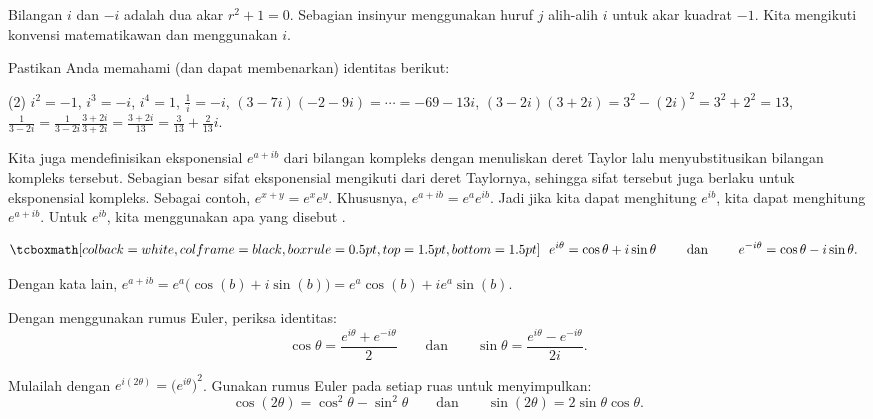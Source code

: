 Bilangan $i$ dan $-i$ adalah dua akar $r^2 + 1 = 0$. Sebagian insinyur menggunakan huruf $j$ alih-alih $i$ untuk akar kuadrat $-1$. Kita mengikuti konvensi matematikawan dan menggunakan $i$.

\begin{exercise}
Pastikan Anda memahami (dan dapat membenarkan) identitas berikut:
\begin{tasks}(2)
\task $i^2 = -1$, $i^3 = -i$, $i^4 = 1$,
\task $\frac{1}{i} = -i$,
\task $(3-7i)(-2-9i) = \cdots = -69-13i$,
\task $(3-2i)(3+2i) = 3^2 - {(2i)}^2 = 3^2 + 2^2 = 13$,
\task $\frac{1}{3-2i} = \frac{1}{3-2i} \frac{3+2i}{3+2i} = \frac{3+2i}{13}
= \frac{3}{13}+\frac{2}{13}i$.
\end{tasks}
\end{exercise}

\pagebreak[2]
Kita juga mendefinisikan eksponensial $e^{a+ib}$ dari bilangan kompleks dengan menuliskan deret Taylor lalu menyubstitusikan bilangan kompleks tersebut. Sebagian besar sifat eksponensial mengikuti dari deret Taylornya, sehingga sifat tersebut juga berlaku untuk eksponensial kompleks. Sebagai contoh, $e^{x+y} = e^x e^y$. Khususnya, $e^{a+ib} = e^a e^{ib}$. Jadi jika kita dapat menghitung $e^{ib}$, kita dapat menghitung $e^{a+ib}$. Untuk $e^{ib}$, kita menggunakan apa yang disebut \emph{}.

\begin{theorem} \label{eulersformula}
\begin{equation*}
\mybxbg{~~
e^{i \theta} = \cos \theta + i \sin \theta
\qquad \text{ dan } \qquad
e^{- i \theta} = \cos \theta - i \sin \theta .
~~}
\end{equation*}
\end{theorem}

Dengan kata lain, $e^{a+ib} = e^a \bigl( \cos(b) + i \sin(b) \bigr) = e^a \cos(b) + i e^a \sin(b)$.

\begin{exercise}
Dengan menggunakan rumus Euler, periksa identitas:
\begin{equation*}
\cos \theta = \frac{e^{i \theta} + e^{-i \theta}}{2}
\qquad \text{dan} \qquad
\sin \theta = \frac{e^{i \theta} - e^{-i \theta}}{2i}.
\end{equation*}
\end{exercise}

\begin{exercise}
Mulailah dengan $e^{i(2\theta)} = {\bigl(e^{i \theta} \bigr)}^2$. Gunakan rumus Euler pada setiap ruas untuk menyimpulkan:
\begin{equation*}
\cos (2\theta) = \cos^2 \theta - \sin^2 \theta
\qquad \text{dan} \qquad
\sin (2\theta) = 2 \sin \theta \cos \theta .
\end{equation*}
\end{exercise}

